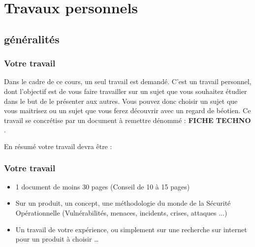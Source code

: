 %                            
%

\section{Travaux personnels}

\subsection{généralités}




\begin{frame}
\frametitle<presentation>{Votre travail}
Dans le cadre de ce cours, un seul travail  est demandé. C'est un travail personnel, dont l'objectif est de vous faire travailler sur un sujet que vous souhaitez étudier dans le but de le présenter aux autres. Vous pouvez donc choisir un sujet que vous maitrisez ou un sujet que vous ferez découvrir avec un regard de béotien.
Ce travail se concrétise par un document à remettre dénommé : \textbf{FICHE TECHNO} .
\end{frame}

En résumé votre travail devra être : 

\begin{frame}
\frametitle<presentation>{Votre travail}
\begin{itemize}
  \item  1 document de moins 30 pages (Conseil de 10 à 15 pages)
  \item  Sur un produit, un concept, une méthodologie du monde de la Sécurité Opérationnelle (Vulnérabilités, menaces, incidents, crises, attaques ...)
  \item  Un travail de votre expérience, ou simplement sur une recherche sur internet pour un produit à choisir … 
\end{itemize}


\end{frame}

